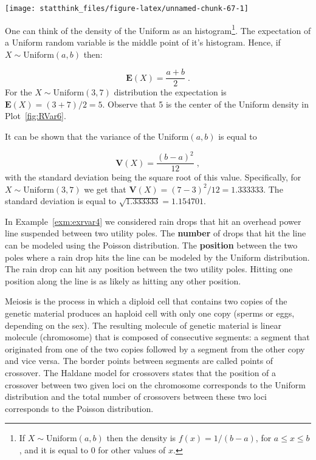 \documentclass[]{krantz}
\newcommand{\Expec}{\mathbf{E}}
\newcommand{\Var}{\mathbf{V}}
\theoremstyle{definition}
\theoremstyle{definition}
\theoremstyle{definition}
\theoremstyle{remark}
\let\BeginKnitrBlock\begin \let\EndKnitrBlock\end
\begin{document}
\begin{center}\texttt{[image: statthink\_files/figure-latex/unnamed-chunk-67-1]} \end{center}

One can think of the density of the Uniform as an histogram\footnote{If \(X \sim \mathrm{Uniform}(a,b)\) then the density is
  \(f(x) = 1/(b-a)\), for \(a \leq x \leq b\), and it is equal to 0 for
  other values of \(x\).}. The
expectation of a Uniform random variable is the middle point of it's
histogram. Hence, if \(X \sim \mathrm{Uniform}(a,b)\) then:

\[\Expec(X) = \frac{a+b}{2}\;.\] For the \(X \sim \mathrm{Uniform}(3,7)\)
distribution the expectation is \(\Expec(X)= (3+7)/2 = 5\). Observe that 5
is the center of the Uniform density in Plot~\ref{fig:RVar6}.

It can be shown that the variance of the \(\mathrm{Uniform}(a,b)\) is
equal to

\[\Var(X) = \frac{(b-a)^2}{12}\;,\] with the standard deviation
being the square root of this value. Specifically, for
\(X \sim \mathrm{Uniform}(3,7)\) we get that
\(\Var(X) = (7-3)^2/12 = 1.333333\). The standard deviation is equal to
\(\sqrt{1.333333} = 1.154701\).

\BeginKnitrBlock{example}
\protect\hypertarget{exm:exrvar5}{}{\label{exm:exrvar5} }In Example~\ref{exm:exrvar4} we considered
rain drops that hit an overhead power line suspended between two utility
poles. The {\textbf{number}} of drops that hit the line can be modeled
using the Poisson distribution. The {\textbf{position}} between the two
poles where a rain drop hits the line can be modeled by the Uniform
distribution. The rain drop can hit any position between the two utility
poles. Hitting one position along the line is as likely as hitting any
other position.
\EndKnitrBlock{example}

\BeginKnitrBlock{example}
\protect\hypertarget{exm:exrvar6}{}{\label{exm:exrvar6} }Meiosis is the process in which a diploid cell
that contains two copies of the genetic material produces an haploid
cell with only one copy (sperms or eggs, depending on the sex). The
resulting molecule of genetic material is linear molecule (chromosome)
that is composed of consecutive segments: a segment that originated from
one of the two copies followed by a segment from the other copy and vice
versa. The border points between segments are called points of
crossover. The Haldane model for crossovers states that the position of
a crossover between two given loci on the chromosome corresponds to the
Uniform distribution and the total number of crossovers between these
two loci corresponds to the Poisson distribution.
\EndKnitrBlock{example}
\end{document}
